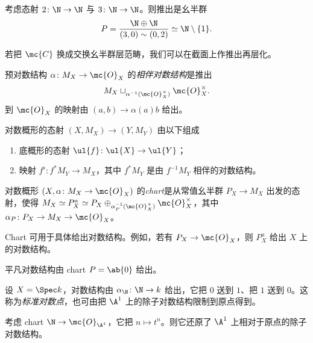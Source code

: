 \begin{exm}
    考虑态射 \(2 \colon \N \to \N\) 与 \(3 \colon \N \to \N\)。则推出是幺半群
    \[ P = \frac{\N \oplus \N}{(3, 0) \sim (0,2)} \simeq \N \setminus \{1\}. \]
\end{exm}

若把 \(\mc{C}\) 换成交换幺半群层范畴，我们可以在截面上作推出再层化。

\begin{defn}
    预对数结构 \(\alpha \colon M_X \to \mc{O}_X\) 的\textit{相伴对数结构}是推出
    \[ M_X \sqcup_{\alpha^{-1}(\mc{O}_X^{\times})} \mc{O}_X^{\times}. \]
    到 \(\mc{O}_X\) 的映射由 \((a,b) \to \alpha(a) b\) 给出。
\end{defn}

\begin{defn}
    对数概形的态射 \((X, M_X) \to (Y, M_Y)\) 由以下组成
    \begin{enumerate}
        \item 底概形的态射 \(\ul{f} \colon \ul{X} \to \ul{Y}\)；
        \item 映射 \(f^{\flat} \colon f^* M_Y \to M_X\)，其中 \(f^* M_Y\) 是由 \(f^{-1} M_Y\) 相伴的对数结构。
    \end{enumerate}
\end{defn}

\begin{defn}
    对数概形 \((X, \alpha \colon M_X \to \mc{O}_X)\) 的\textit{chart}是从常值幺半群 \(P_X \to M_X\) 出发的态射，使得 \(M_X \simeq P_X^a \simeq P_X \oplus_{\alpha_P^{-1}(\mc{O}_X^{\times})} \mc{O}_X^{\times}\)，其中 \(\alpha_P \colon P_X \to M_X \to \mc{O}_X\)。
\end{defn}

Chart 可用于具体给出对数结构。例如，若有 \(P_X \to \mc{O}_X\)，则 \(P_X^a\) 给出 \(X\) 上的对数结构。

\begin{exm}
    平凡对数结构由 chart \(P = \ab\{0\}\) 给出。
\end{exm}

\begin{exm}
    设 \(X = \Spec k\)，对数结构由 \(\alpha_{\N} \colon \N \to k\) 给出，它把 \(0\) 送到 \(1\)、把 \(1\) 送到 \(0\)。这称为\textit{标准对数点}，也可由把 \(\A^1\) 上的除子对数结构限制到原点得到。
\end{exm}

\begin{exm}
    考虑 chart \(\N \to \mc{O}_{\A^1}\)，它把 \(n \mapsto t^n\)。则它还原了 \(\A^1\) 上相对于原点的除子对数结构。
\end{exm}

